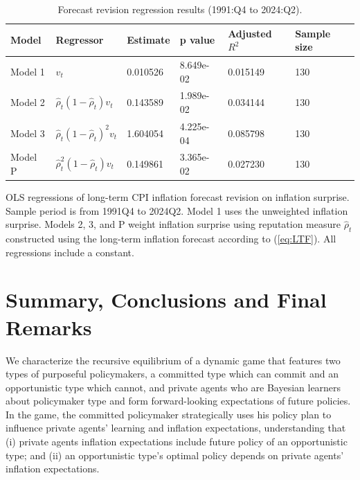 \documentclass[12pt,letter,leqno]{article}
\theoremstyle{asn}
\theoremstyle{lem}
\theoremstyle{slem}
\theoremstyle{prop}
\theoremstyle{appprop}
\theoremstyle{rem}
\theoremstyle{defn}
\begin{document}
\begin{table}[htbp]
  \centering
  \caption{Forecast revision regression results (1991:Q4 to 2024:Q2).}
  \begin{tabular}{@{}llllll@{}}
  \toprule
  Model & Regressor & Estimate & p value & Adjusted $R^2$ & Sample size \\
  \midrule
  Model 1 & $v_t$ & 0.010526 & 8.649e-02 & 0.015149 & 130 \\
  Model 2 & $\widehat{\rho}_t(1-\widehat{\rho}_t) v_t$ & 0.143589 & 1.989e-02 & 0.034144 & 130 \\
  Model 3 & $\widehat{\rho}_t(1-\widehat{\rho}_t)^2 v_t$ & 1.604054 & 4.225e-04 & 0.085798 & 130 \\
  Model P & $\widehat{\rho}^2_t(1-\widehat{\rho}_t) v_t$ & 0.149861 & 3.365e-02 & 0.027230 & 130 \\
  \bottomrule
  \end{tabular}
  \label{tab:regression}%

\begin{flushleft}
\footnotesize{OLS regressions of long-term CPI inflation forecast revision on inflation surprise. Sample period is from 1991Q4 to 2024Q2. Model 1 uses the unweighted inflation surprise. Models 2, 3, and P weight inflation surprise using reputation measure $\widehat{\rho}_t$ constructed using the long-term inflation forecast according to (\ref{eq:LTF}). All regressions include a constant.}
\end{flushleft}
  \end{table}





\section{Summary, Conclusions and Final Remarks}
We characterize the recursive equilibrium of a dynamic game that features two types of purposeful policymakers, a committed type which can commit and an opportunistic type which cannot, and private agents who are Bayesian learners about policymaker type and form forward-looking expectations of future policies. In the game, the committed policymaker strategically uses his policy plan to influence private agents' learning and inflation expectations, understanding that (i) private agents inflation expectations include future policy of an opportunistic type; and (ii) an opportunistic type’s optimal policy depends on private agents' inflation expectations. 
\end{document}
